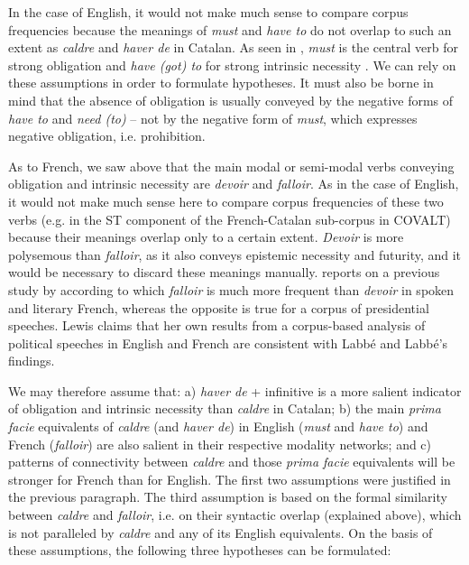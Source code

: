 \documentclass[output=paper,english,spanish,german,english]{langsci/langscibook}
\begin{document}
In the case of English, it would not make much sense to compare corpus frequencies because the meanings of \textit{must} and \textit{have to} do not overlap to such an extent as \textit{caldre} and \textit{haver de} in Catalan. As seen in , \textit{must} is the central verb for strong obligation and \textit{have (got) to} for strong intrinsic necessity \parencite{raddir07}. We can rely on these assumptions in order to formulate hypotheses. It must also be borne in mind that the absence of obligation is usually conveyed by the negative forms of \textit{have to} and \textit{need (to)} -- not by the negative form of \textit{must}, which expresses negative obligation, i.e. prohibition.

As to French, we saw above that the main modal or semi-modal verbs conveying obligation and intrinsic necessity are \textit{devoir} and \textit{falloir}. As in the case of English, it would not make much sense here to compare corpus frequencies of these two verbs (e.g. in the ST component of the French-Catalan sub-corpus in COVALT) because their meanings overlap only to a certain extent. \textit{Devoir} is more polysemous than \textit{falloir}, as it also conveys epistemic necessity and futurity, and it would be necessary to discard these meanings manually. \citet{lewis15} reports on a previous study by \citet{lablab13} according to which \textit{falloir} is much more frequent than \textit{devoir} in spoken and literary French, whereas the opposite is true for a corpus of presidential speeches. Lewis claims that her own results from a corpus-based analysis of political speeches in English and French are consistent with Labbé and Labbé’s findings.

We may therefore assume that: a) \textit{haver de} + infinitive is a more salient indicator of obligation and intrinsic necessity than \textit{caldre} in Catalan; b) the main \textit{prima facie} equivalents of \textit{caldre} (and \textit{haver de}) in English (\textit{must} and \textit{have to}) and French (\textit{falloir}) are also salient in their respective modality networks; and c) patterns of connectivity between \textit{caldre} and those \textit{prima facie} equivalents will be stronger for French than for English. The first two assumptions were justified in the previous paragraph. The third assumption is based on the formal similarity between \textit{caldre }and \textit{falloir}, i.e. on their syntactic overlap (explained above), which is not paralleled by \textit{caldre} and any of its English equivalents. On the basis of these assumptions, the following three hypotheses can be formulated:
\end{document}
